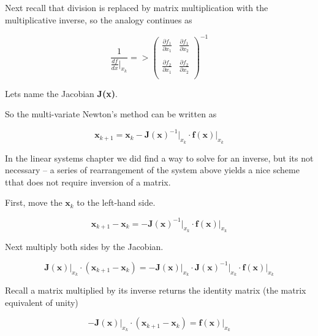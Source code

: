 Next recall that division is replaced by matrix multiplication with the multiplicative inverse, so the analogy continues as

\begin{equation}
\frac{1}{\frac{df}{dx}\rvert_{x_k}} =>
{\begin{pmatrix}
\frac{\partial f_1}{\partial x_1} & \frac{\partial f_1}{\partial x_2} \\
~ & ~ \\
\frac{\partial f_2}{\partial x_1} & \frac{\partial f_2}{\partial x_2} \\
\end{pmatrix}}^{-1}
\label{eqn:JacobianInverse}
\end{equation}

Lets name the Jacobian \textbf{J(x)}.

So the multi-variate Newton's method can be written as

\begin{equation}
\mathbf{x}_{k+1}=\mathbf{x}_{k} - \mathbf{J(x)}^{-1}\rvert_{x_k} \cdot \mathbf{f(x)}\rvert_{x_k}
\label{eqn:VectorNewtonFormula}
\end{equation}

In the linear systems chapter we did find a way to solve for an inverse, but its not necessary -- a series of rearrangement of the system above yields a nice scheme tthat does not require inversion of a matrix.

First, move the $\mathbf{x}_{k}$ to the left-hand side.

\begin{equation}
\mathbf{x}_{k+1}-\mathbf{x}_{k} = - \mathbf{J(x)}^{-1}\rvert_{x_k} \cdot \mathbf{f(x)}\rvert_{x_k}
\label{eqn:VectorNewtonFormula}
\end{equation}

Next multiply both sides by the Jacobian. 

\begin{equation}
\mathbf{J(x)}\rvert_{x_k} \cdot (\mathbf{x}_{k+1}-\mathbf{x}_{k}) = - \mathbf{J(x)}\rvert_{x_k} \cdot \mathbf{J(x)}^{-1}\rvert_{x_k} \cdot \mathbf{f(x)}\rvert_{x_k}
\label{eqn:VectorNewtonFormula}
\end{equation}

Recall a matrix multiplied by its inverse returns the identity matrix (the matrix equivalent of unity)

\begin{equation}
- \mathbf{J(x)}\rvert_{x_k} \cdot (\mathbf{x}_{k+1}-\mathbf{x}_{k}) = \mathbf{f(x)}\rvert_{x_k}
\label{eqn:NewtonRaphsonFormula}
\end{equation}


